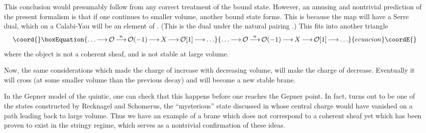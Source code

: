 \documentclass[a4paper,12pt]{amsart}
\numberwithin{equation}{section}
\theoremstyle{plain}
\theoremstyle{definition}
\def\mapr{\mathop{\longrightarrow}\limits}
\def\cal{\mathcal}
\def \Tr {{\rm Tr}}
\def\CO{{\cal O}}
\begin{document}
This conclusion would presumably follow from any correct treatment of
the bound state.  However, an amusing and nontrivial prediction of the
present formalism is that if one continues to smaller volume, another
bound state forms.  This is because the map \myHighlight{$\CO(-1)\mapr \CO$}\coordHE{} will
have a Serre dual, which on a Calabi-Yau will be an element of
\myHighlight{$H^n(\CO,\CO(-1))$}\coordHE{}.  (This is the dual under the natural pairing
\myHighlight{$(\alpha,\beta)=\int \bar\Omega^{(n)} \wedge \Tr \alpha \wedge \beta$}\coordHE{}.)
This fits into another triangle
\begin{equation}\coord{}\boxEquation{
\ldots \mapr \CO \mapr^n \CO(-1) \mapr X \mapr \CO[1] \mapr\ldots 
}{
\ldots \mapr \CO \mapr^n \CO(-1) \mapr X \mapr \CO[1] \mapr\ldots 
}{ecuacion}\coordE{}\end{equation}
where the object \coordHE{} is not a coherent sheaf, and is not stable at
large volume.

Now, the same considerations which made the \coordHE{} charge of \myHighlight{$\mapr^0$}\coordHE{}
increase with decreasing volume, will make the \coordHE{} charge of \myHighlight{$\mapr^n$}\coordHE{}
decrease.  Eventually it will cross \coordHE{} (at some smaller volume
than the previous decay) and \coordHE{} will become a new stable brane.

In the Gepner model of the quintic, one can check that this happens
before one reaches the Gepner point.  In fact, \coordHE{} turns out to be one
of the states constructed by Recknagel and Schomerus, the
``mysterious'' state discussed in \cite{Doug,Denef} whose central
charge would have vanished on a path leading back to large volume.
Thus we have an example of a brane which does not correspond to a
coherent sheaf yet which has been proven to exist in the stringy
regime, which serves as a nontrivial confirmation of these ideas.
\end{document}
